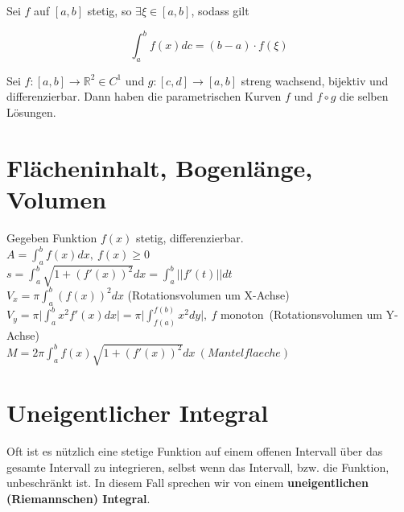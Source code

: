 \begin{theorem}
Sei $f$ auf $[a,b]$ stetig, so $\exists \xi \in [a,b]$, sodass gilt
	
	$$\int_{a}^{b}f(x)dc = (b-a) \cdot f(\xi)$$
\end{theorem}


\begin{theorem}
Sei $f:[a,b]\rightarrow \mathbb{R}^2 \in C^1$ und $g: [c,d]\rightarrow [a,b]$ streng wachsend, bijektiv und differenzierbar. Dann haben die parametrischen Kurven $f$ und $f\circ g$ die selben Lösungen.
\end{theorem}


\section{Flächeninhalt, Bogenlänge, Volumen}


Gegeben Funktion $f(x)$ stetig, differenzierbar.
\\\noindent$A  = \int_{a}^{b}f(x)dx,\ f(x) \geq 0$\\
$s = \int_{a}^{b}\sqrt{1+(f'(x))^2}dx = \int_{a}^{b}||f'(t)||dt$\\
$V_x = \pi \int_{a}^{b}(f(x))^2dx$ (Rotationsvolumen um X-Achse)\\
$V_y = \pi \bigg|\int_{a}^{b}x^2f'(x)dx\bigg| = \pi\bigg|\int_{f(a)}^{f(b)}x^2 dy\bigg|, \ f $ monoton\ (Rotationsvolumen um Y-Achse)\\
$M = 2\pi \int_{a}^{b}f(x)\sqrt{1+(f'(x))^2}dx\ (Mantelflaeche)$

\section{Uneigentlicher Integral}

\begin{concept}
	Oft ist es nützlich eine stetige Funktion auf einem offenen Intervall über das gesamte Intervall zu integrieren, selbst wenn das Intervall, bzw. die Funktion, unbeschränkt ist. In diesem Fall sprechen wir von einem \textbf{uneigentlichen (Riemannschen) Integral}.
\end{concept}

